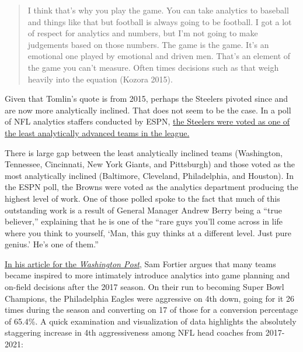 \documentclass[
  letterpaper,
]{krantz}
\begin{document}
\begin{quote}
I think that's why you play the game. You can take analytics to baseball
and things like that but football is always going to be football. I got
a lot of respect for analytics and numbers, but I'm not going to make
judgements based on those numbers. The game is the game. It's an
emotional one played by emotional and driven men. That's an element of
the game you can't measure. Often times decisions such as that weigh
heavily into the equation (Kozora 2015).
\end{quote}

Given that Tomlin's quote is from 2015, perhaps the Steelers pivoted
since and are now more analytically inclined. That does not seem to be
the case. In a poll of NFL analytics staffers conducted by ESPN,
\href{https://www.espn.com/nfl/story/_/id/29939438/2020-nfl-analytics-survey-which-teams-most-least-analytically-inclined\#least}{the
Steelers were voted as one of the least analytically advanced teams in
the league.}

There is large gap between the least analytically inclined teams
(Washington, Tennessee, Cincinnati, New York Giants, and Pittsburgh) and
those voted as the most analytically inclined (Baltimore, Cleveland,
Philadelphia, and Houston). In the ESPN poll, the Browns were voted as
the analytics department producing the highest level of work. One of
those polled spoke to the fact that much of this outstanding work is a
result of General Manager Andrew Berry being a ``true believer,''
explaining that he is one of the ``rare guys you'll come across in life
where you think to yourself, `Man, this guy thinks at a different level.
Just pure genius.' He's one of them.''

\href{https://www.washingtonpost.com/sports/2020/01/16/nfls-analytics-movement-has-finally-reached-sports-mainstream/}{In
his article for the \emph{Washington Post}}, Sam Fortier argues that
many teams became inspired to more intimately introduce analytics into
game planning and on-field decisions after the 2017 season. On their run
to becoming Super Bowl Champions, the Philadelphia Eagles were
aggressive on 4th down, going for it 26 times during the season and
converting on 17 of those for a conversion percentage of 65.4\%. A quick
examination and visualization of data highlights the absolutely
staggering increase in 4th aggressiveness among NFL head coaches from
2017-2021:
\end{document}
